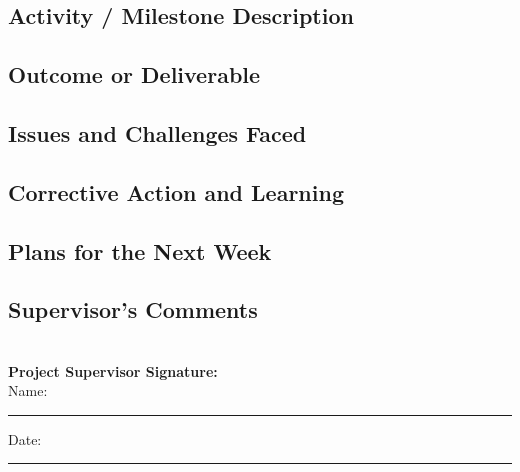 \documentclass[a4paper]{article}
\begin{document}
				 
\subsection*{Activity / Milestone Description}
\framebox[\textwidth][c]{\rule{0pt}{4cm}}

\subsection*{Outcome or Deliverable}
\framebox[\textwidth][c]{\rule{0pt}{4cm}}


\subsection*{Issues and Challenges Faced}
\framebox[\textwidth][c]{\rule{0pt}{4cm}}


\subsection*{Corrective Action and Learning}
\framebox[\textwidth][c]{\rule{0pt}{4cm}}


\subsection*{Plans for the Next Week}
\framebox[\textwidth][c]{\rule{0pt}{4cm}}

\subsection*{Supervisor's Comments}
\framebox[\textwidth][c]{\rule{0pt}{4cm}}\\[2em]

\vfill
\textbf{Project Supervisor Signature:}\\[1em]
Name: \rule{6cm}{0.4pt} \hfill Date: \rule{4cm}{0.4pt}
\end{document}
